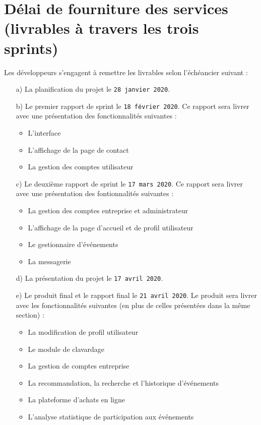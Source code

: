 \documentclass[letter,12pt]{exam}
\begin{document}
\section{Délai de fourniture des services\\ (livrables à travers les
trois
sprints)}

Les développeurs s'engagent à remettre les livrables selon l'échéancier
suivant :

\begin{itemize}
\tightlist
\item[a)]
  La planification du projet le \texttt{28\ janvier\ 2020}.
\item[b)]
  Le premier rapport de sprint le \texttt{18\ février\ 2020}. Ce rapport
  sera livrer avec une présentation des fonctionnalités suivantes :

  \begin{itemize}
  \tightlist
  \item
    L'interface
  \item
    L'affichage de la page de contact
  \item
    La gestion des comptes utilisateur
  \end{itemize}
\item[c)]
  Le deuxième rapport de sprint le \texttt{17\ mars\ 2020}. Ce rapport
  sera livrer avec une présentation des fontionnalités suivantes :

  \begin{itemize}
  \tightlist
  \item
    La gestion des comptes entreprise et administrateur
  \item
    L'affichage de la page d'accueil et de profil utilisateur
  \item
    Le gestionnaire d'événements
  \item
    La messagerie
  \end{itemize}
\item[d)]
  La présentation du projet le \texttt{17\ avril\ 2020}.
\item[e)]
  Le produit final et le rapport final le \texttt{21\ avril\ 2020}. Le
  produit sera livrer avec les fonctionnalités suivantes (en plus de
  celles présentées dans la même section) :

  \begin{itemize}
  \tightlist
  \item
    La modification de profil utilisateur
  \item
    Le module de clavardage
  \item
    La gestion de comptes entreprise
  \item
    La recommandation, la recherche et l'historique d'événements
  \item
    La plateforme d'achats en ligne
  \item
    L'analyse statistique de participation aux événements
  \end{itemize}
\end{itemize}
\end{document}
